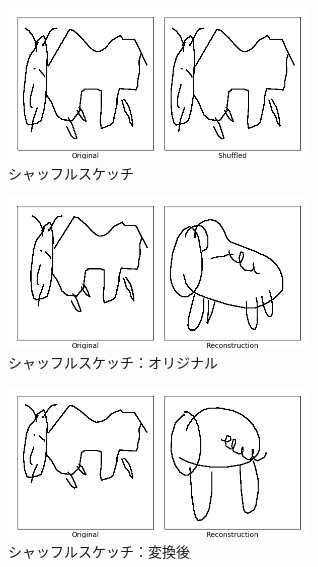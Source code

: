 \documentclass[onecolumn]{ujarticle}   %
\begin{document}
\newpage
\begin{figure}[th]
  \begin{center}
    \includegraphics[clip,width=80mm]{sketch_tra_shuffle_0.png}
    \caption{シャッフルスケッチ}
    \label{fig:result2}
  \end{center}
\end{figure}
\begin{figure}[th]
  \begin{center}
    \includegraphics[clip,width=80mm]{sketch_tra_shuffle_org_0.png}
    \caption{シャッフルスケッチ：オリジナル}
    \label{fig:result2_org}
  \end{center}
\end{figure}
\begin{figure}[th]
  \begin{center}
    \includegraphics[clip,width=80mm]{sketch_tra_shuffle_rvr_0.png}
    \caption{シャッフルスケッチ：変換後}
    \label{fig:result2_rvr}
  \end{center}
\end{figure}








% 
% 
\end{document}
